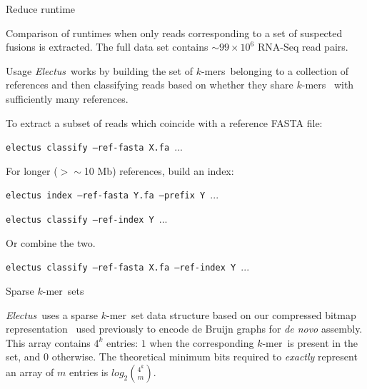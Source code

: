 \documentclass[a0paper,portrait]{baposter}
\newcommand{\kmer}{$k$-mer\ }
\newcommand{\kmers}{$k$-mers\ }
\newcommand{\Electus}{\textit{Electus}\ }
\begin{document}
\begin{poster}
\begin{posterbox}[name=runtime,column=1,below=graphs]{Reduce runtime}
\begin{center}
\vspace{0.5em}

\footnotesize
Comparison of runtimes when only reads corresponding to a set of suspected fusions is extracted. 
The full data set contains $\sim99\times10^6$ RNA-Seq read pairs.
\end{center}

\end{posterbox}

\begin{posterbox}[name=usage,column=2,row=0]{Usage}
\Electus works by building the set of \kmers belonging to a collection of references 
and then classifying reads based on whether they share \kmers
with sufficiently many references. 

To extract a subset of reads which coincide with a reference FASTA file:

\hspace{0.1em} {\tt\footnotesize electus classify --ref-fasta X.fa $...$}

For longer ({\footnotesize$>\sim$}10 Mb) references, build an index:

\hspace{0.1em} {\tt\footnotesize electus index --ref-fasta Y.fa --prefix Y $...$}

\hspace{0.1em} {\tt\footnotesize electus classify --ref-index Y $...$}

Or combine the two.

\hspace{0.1em} {\tt\footnotesize electus classify --ref-fasta X.fa --ref-index Y $...$}

\end{posterbox}

\begin{posterbox}[name=kmers,column=2,below=usage]{Sparse \kmer sets}

\Electus uses a sparse \kmer set data structure based on our compressed bitmap representation\ \cite{ConwayBromage2011}
used previously to encode de Bruijn graphs for {\em de novo} assembly.
This array contains $4^k$ entries: $1$ when the corresponding \kmer is present in the set, and $0$ otherwise.
The theoretical minimum bits required to {\em exactly} represent an array of $m$ entries is $\mathit{log}_2 {{4^k}\choose{m}}$.


\end{posterbox}
\end{poster}
\end{document}
